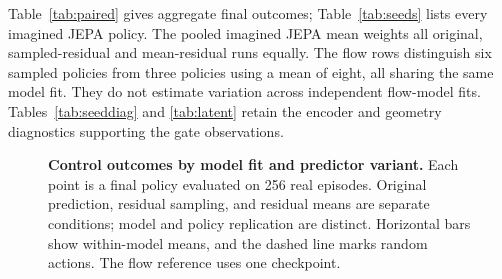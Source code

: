 Table~\ref{tab:paired} gives aggregate final outcomes; Table~\ref{tab:seeds} lists every
imagined JEPA policy. The pooled imagined JEPA mean weights all original, sampled-residual and
mean-residual runs equally. The flow rows distinguish six sampled policies from three policies
using a mean of eight, all sharing the same model fit. They do not estimate variation across
independent flow-model fits. Tables~\ref{tab:seeddiag} and \ref{tab:latent} retain the encoder
and geometry diagnostics supporting the gate observations.

\begin{figure}[t]
\centering
{}
\caption{\textbf{Control outcomes by model fit and predictor variant.} Each point is a final policy
evaluated on 256 real episodes. Original prediction, residual sampling, and residual means are
separate conditions; model and policy replication are distinct. Horizontal bars show within-model means,
and the dashed line marks random actions. The flow reference uses one checkpoint.}
\label{fig:control}
\end{figure}

\begin{table}[ht]
\centering
\caption{Final control outcomes in the real gate, mean $\pm$ standard deviation over policy runs.
Imagined training uses $1{,}228{,}800$ transitions per policy; real training uses $1{,}499{,}136$.
Model-fit counts and policy-run counts identify distinct replication levels.}
\label{tab:paired}
\end{table}

\begin{table}[ht]
\centering
\caption{Every imagined JEPA policy at its final checkpoint: survival (percent) and walls per
episode by encoder seed, predictor variant and PPO seed. Each cell uses $256$ real episodes.}
\label{tab:seeds}
\end{table}

\begin{table}[ht]
\centering
\caption{Grid-JEPA diagnostics by encoder seed. Wall amplitude and total teacher-forced residual
are squared distances at future steps $1$ and $8$; decoded intensity uses steps $1$ and $2$.
The wall coordinate has endpoints $0$ (wall absent) and $1$ (true encoding).
Head AUC compares each death cause with alive transitions; PPO wall counts pool predictor variants.}
\label{tab:seeddiag}
\end{table}


